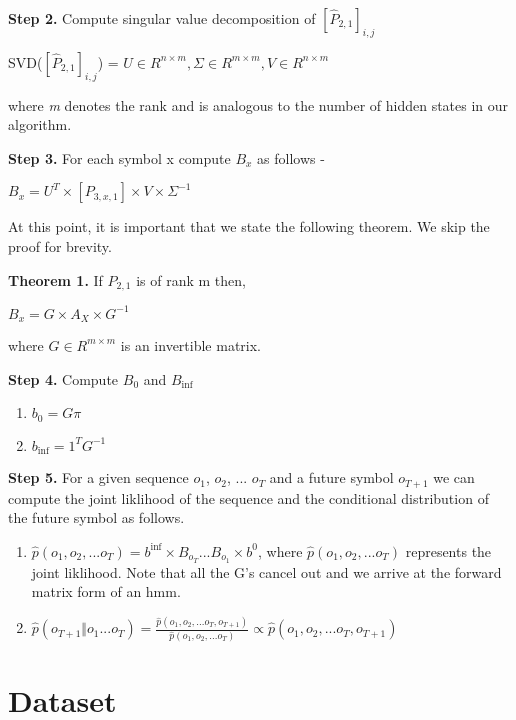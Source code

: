 \documentclass{article} %
\begin{document}
\textbf{Step 2.} Compute singular value decomposition of $[\hat{P}_{2,1}]_{i,j}$ 
\begin{center} SVD($[\hat{P}_{2,1}]_{i,j}$) = $U \in R^{n\times m} ,  \Sigma \in R^{m\times m} , V \in R^{n \times m}$
\end{center}
where \textit{m} denotes the rank and is analogous to the number of hidden states in our algorithm.

\textbf{Step 3.} For each symbol x compute $B_x$ as follows -
\begin{center}
$B_x = U^T \times [P_{3,x,1}] \times V \times \Sigma^{-1}$
\end{center}

At this point, it is important that we state the following theorem. We skip the proof for brevity.

\textbf{Theorem 1.} If $P_{2,1}$ is of rank m then,
\begin{center}
$B_x = G \times A_X \times G^{-1}$
\end{center}
where $G \in R^{m \times m}$ is an invertible matrix.

\textbf{Step 4.} Compute $B_{0}$ and $B_{\inf}$
\begin{enumerate}
\item $b_{0} = G\pi$ 
\item $b_{\inf} = 1^TG^{-1}$
\end{enumerate}

\textbf{Step 5.} For a given sequence $o_1$, $o_2$, ... $o_T$ and a future symbol $o_{T+1}$ we can compute the joint liklihood of the sequence and the conditional distribution of the future symbol as follows.
\begin{enumerate}
\item $\hat{p}(o_1, o_2, ... o_T) = b^{\inf} \times B_{o_{T}} . . . B_{o_{1}} \times b^{0}$, 
\newline where $\hat{p}(o_1, o_2, ... o_T)$ represents the joint liklihood. Note that all the G's cancel out and we arrive at the forward matrix form of an hmm.

\item $\hat{p}(o_{T+1} \Vert o_{1}...o_{T} ) = \frac{\hat{p}(o_1, o_2, ... o_T, o_{T+1})}{\hat{p}(o_1, o_2, ... o_T)} \propto \hat{p}(o_1, o_2, ... o_T, o_{T+1})$ 

\end{enumerate}


\section{Dataset}
\end{document}
